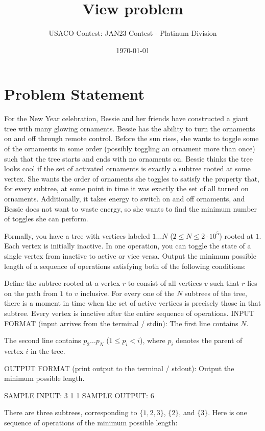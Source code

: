 \documentclass[12pt]{article}
\title{View problem}
\author{USACO Contest: JAN23 Contest - Platinum Division}
\date{\today}
\begin{document}
\maketitle

\section*{Problem Statement}


For the New Year celebration, Bessie and her friends have constructed a giant
tree with many glowing ornaments. Bessie has the ability to turn the ornaments
on and off through remote control. Before the sun rises, she wants to toggle
some of the ornaments in some order (possibly toggling an ornament more than
once) such that the tree starts and ends with no ornaments on. Bessie thinks the
tree looks cool if the set of activated ornaments is exactly a subtree rooted at
some vertex. She wants the order of ornaments she toggles to satisfy the
property that, for every subtree, at some point in time it was exactly the set
of all turned on ornaments. Additionally, it takes energy to switch on and off
ornaments, and Bessie does not want to waste energy, so she wants to find the
minimum number of toggles she can perform.

Formally, you have a tree with vertices labeled $1\dots N$
($2\le N\le 2\cdot 10^5$) rooted at $1$.  Each vertex is initially inactive. In
one operation, you can toggle the state of a single vertex from inactive to
active or vice versa. Output the minimum possible length of a sequence of
operations satisfying both of the following conditions:

Define the subtree rooted at a vertex $r$ to consist of all vertices $v$
such that $r$ lies on the path from $1$ to $v$ inclusive. For every one of the
$N$ subtrees of the tree, there is a moment in time when the set of active
vertices is precisely those in that subtree. Every vertex is inactive after the entire sequence of operations.
INPUT FORMAT (input arrives from the terminal / stdin):
The first line contains $N$.

The second line contains $p_2 \dots p_N$ ($1\le p_i<i$), where $p_i$ denotes the
parent of vertex $i$ in the tree.

OUTPUT FORMAT (print output to the terminal / stdout):
Output the minimum possible length.

SAMPLE INPUT:
3
1 1
SAMPLE OUTPUT: 
6

There are three subtrees, corresponding to $\{1,2,3\}$, $\{2\}$, and $\{3\}$.
Here is one sequence of operations of the minimum possible length:
\end{document}
